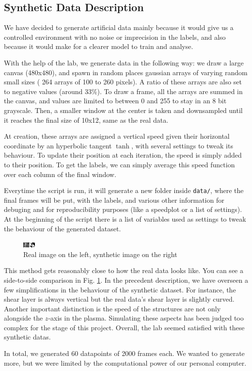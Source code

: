 \documentclass[10pt,conference]{IEEEtran}
\begin{document}
\subsection{Synthetic Data Description}
We have decided to generate artificial data mainly because it would give us a controlled environment with no noise or imprecision in the labels, and also because it would make for a clearer model to train and analyse.\par
With the help of the lab, we generate data in the following way: we draw a large canvas (480x480), and spawn in random places gaussian arrays of varying random small sizes ( 264 arrays of 100 to 260 pixels). A ratio of these arrays are also set to negative values (around 33\%). To draw a frame, all the arrays are summed in the canvas, and values are limited to between 0 and 255 to stay in an 8 bit grayscale. Then, a smaller window at the center is taken and downsampled until it reaches the final size of 10x12, same as the real data.\par
At creation, these arrays are assigned a vertical speed given their horizontal coordinate by an hyperbolic tangent $\tanh$, with several settings to tweak its behaviour. To update their position at each iteration, the speed is simply added to their position. To get the labels, we can simply average this speed function over each column of the final window.\par
Everytime the script is run, it will generate a new folder inside \texttt{data/}, where the final frames will be put, with the labels, and various other information for debuging and for reproducibility purposes (like a speedplot or a list of settings).
At the beginning of the script there is a list of variables used as settings to tweak the behaviour of the generated dataset.
 
\begin{figure}
  \centering
  \includegraphics[scale=5]{images/comparison.png}
  \caption{Real image on the left, synthetic image on the right}
\label{comparison}
\end{figure}
 
This method gets reasonably close to how the real data looks like. You can see a side-to-side comparison in Fig. \ref{comparison}. In the precedent description, we have overseen a few simplifications in the behaviour of the synthetic dataset. For instance, the shear layer is always vertical but the real data's shear layer is slightly curved. Another important distinction is the speed of the structures are not only alongside the $z$-axis in the plasma. Simulating these aspects has been judged too complex for the stage of this project. Overall, the lab seemed satisfied with these synthetic datas.\par
In total, we generated 60 datapoints of 2000 frames each. We wanted to generate more, but we were limited by the computational power of our personal computer.
 
\end{document}
